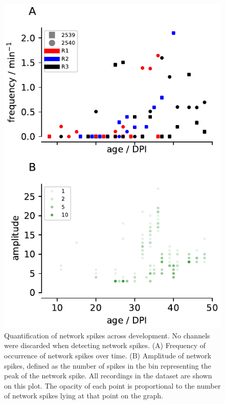 \documentclass[doublespacing]{bmcart}
\begin{document}
\begin{backmatter}
\begin{figure}[h!]
    \includegraphics{../plots/network_spikes_scatter.pdf}
	\caption{Quantification of network spikes across development. No channels were discarded when detecting network spikes. (A) Frequency of occurrence of network spikes over time. (B) Amplitude of network spikes, defined as the number of spikes in the bin representing the peak of the network spike. All recordings in the dataset are shown on this plot. The opacity of each point is proportional to the number of network spikes lying at that point on the graph.}
	\label{fig:networkfreq}
\end{figure}

\end{backmatter}
\end{document}
